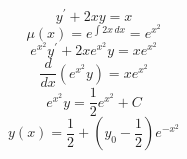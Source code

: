 \documentclass{article}
\begin{document}
\[
y^{\prime}+2xy=x
\]
\[
\mu(x)=e^{\int2x\,dx}=e^{x^2}
\]
\[
e^{x^2}y^{\prime}+2xe^{x^2}y=xe^{x^2}
\]
\[
\frac{d}{dx}(e^{x^2}y)=xe^{x^2}
\]
\[
e^{x^2}y=\frac{1}{2}e^{x^2}+C
\]
\[
y(x)=\frac{1}{2}+\left(y_0-\frac{1}{2}\right)e^{-x^2}
\]
\end{document}
